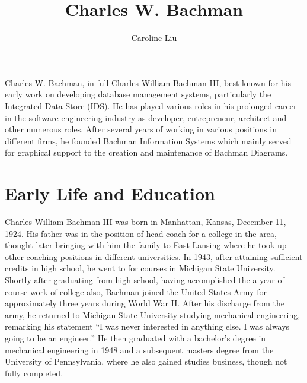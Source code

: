 \documentclass[a4paper]{article}
\title{Charles W. Bachman}
\author{Caroline Liu}
\begin{document}
\maketitle

Charles W. Bachman, in full Charles William Bachman III, best known for his early work on developing database management systems, particularly the Integrated Data Store (IDS). He has played various roles in his prolonged career in the software engineering industry as developer, entrepreneur, architect and other numerous roles.
\bigbreak
After several years of working in various positions in different firms, he founded Bachman Information Systems\cite{histmuseam} which mainly served for graphical support to the creation and maintenance of Bachman Diagrams.


\section{Early Life and Education}
Charles William Bachman III was born in Manhattan, Kansas, December 11, 1924. His father was in the position of head coach for a college in the area, thought later bringing with him the family to East Lansing where he took up other coaching positions in different universities. In 1943, after attaining sufficient credits in high school, he went to for courses in Michigan State University.\cite{ebritannica} Shortly after graduating from high school, having accomplished the a year of course work of college also, Bachman joined the United States Army for approximately three years during World War II.
\bigbreak
After his discharge from the army, he returned to Michigan State University studying mechanical engineering, remarking his statement “I was never interested in anything else. I was always going to be an engineer.” \cite{interview}He then graduated with a bachelor's degree in mechanical engineering in 1948 and a subsequent masters degree from the University of Pennsylvania, where he also gained studies business, though not fully completed\cite{histmuseam}.
\end{document}
